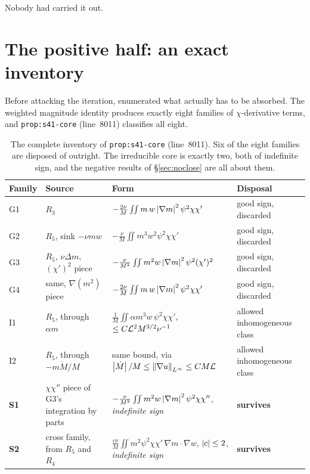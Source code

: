 Nobody had carried it out.

\section{The positive half: an exact inventory}
\label{sec:inventory}

Before attacking the iteration,  enumerated what actually has to be
absorbed. The weighted magnitude identity produces exactly eight families of
\(\chi\)-derivative terms, and \texttt{prop:s41-core} (line~8011) classifies
all eight.

\begin{table}[ht]
\centering
\scriptsize
\begin{tabular}{@{}l >{\raggedright\arraybackslash}p{} >{\raggedright\arraybackslash}p{} >{\raggedright\arraybackslash}p{}@{}}
\toprule
Family & Source & Form & Disposal \\
\midrule
G1 & \(R_3\)
  & \(-\tfrac{2\nu}{M}\iint m\,w\left|\nabla m\right|^2\psi^2\chi\chi'\)
  & good sign, discarded \\
G2 & \(R_5\), sink \(-\nu m w\)
  & \(-\tfrac{\nu}{M}\iint m^3w^2\psi^2\chi\chi'\)
  & good sign, discarded \\
G3 & \(R_5\), \(\nu\Delta m\), \((\chi')^2\) piece
  & \(-\tfrac{\nu}{M^2}\iint m^2w\left|\nabla m\right|^2\psi^2(\chi')^2\)
  & good sign, discarded \\
G4 & same, \(\nabla(m^2)\) piece
  & \(-\tfrac{2\nu}{M}\iint m\,w\left|\nabla m\right|^2\psi^2\chi\chi'\)
  & good sign, discarded \\
\addlinespace
I1 & \(R_5\), through \(\alpha m\)
  & \(\tfrac1M\iint\alpha m^3w\,\psi^2\chi\chi'\),
    \(\le C\mathcal{L}^2M^{3/2}\nu^{-1}\)
  & allowed inhomogeneous class \\
I2 & \(R_5\), through \(-m\dot M/M\)
  & same bound, via \(\left|\dot M\right|/M\le\left\|\nabla u\right\|_{L^\infty}\le CM\mathcal{L}\)
  & allowed inhomogeneous class \\
\addlinespace
\textbf{S1} & \(\chi\chi''\) piece of G3's integration by parts
  & \(-\tfrac{\nu}{M^2}\iint m^2w\left|\nabla m\right|^2\psi^2\chi\chi''\),
    \emph{indefinite sign}
  & \textbf{survives} \\
\textbf{S2} & cross family, from \(R_5\) and \(R_4\)
  & \(\tfrac{c\nu}{M}\iint m^2\psi^2\chi\chi'\,\nabla m\cdot\nabla w\),
    \(\left|c\right|\le2\), \emph{indefinite sign}
  & \textbf{survives} \\
\bottomrule
\end{tabular}
\caption[The eight cutoff-derivative families]{The complete inventory of
\texttt{prop:s41-core} (line~8011). Six of the eight families are disposed of
outright. The irreducible core is exactly two, both of indefinite sign, and
the negative results of \S\ref{sec:noclose} are all about them.}
\label{tab:s41-families}
\end{table}


